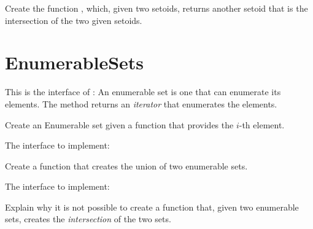 \begin{exercise}
  Create the function , which, given two setoids, returns another setoid that is the intersection of the two given setoids.
%
\end{exercise}


\section{EnumerableSets}

This is the interface of :
%
%
An enumerable set is one that can enumerate its elements.
The method  returns an \emph{iterator} that enumerates the elements.

\begin{exercise}
  Create an Enumerable set given a function that provides the $i$-th element.

  The interface to implement:
%
\end{exercise}

\begin{exercise}
  Create a function that creates the union of two enumerable sets.

  The interface to implement:
%
\end{exercise}

\begin{exercise}
  Explain why it is not possible to create a function that, given two enumerable sets,
  creates the \emph{intersection} of the two sets.
\end{exercise}


